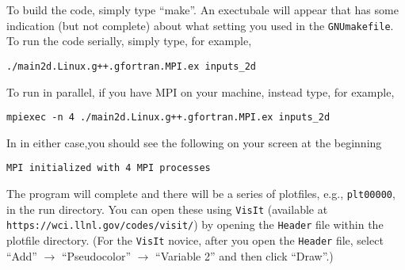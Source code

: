 To build the code, simply type ``make''.  An exectubale will appear that has some indication (but not complete)
about what setting you used in the {\tt GNUmakefile}.  To run the code serially, simply type, for example,
\begin{lstlisting}[language={[gnu]make},mathescape=false]
./main2d.Linux.g++.gfortran.MPI.ex inputs_2d
\end{lstlisting}
To run in parallel, if you have MPI on your machine, instead type, for example,
\begin{lstlisting}[language={[gnu]make},mathescape=false]
mpiexec -n 4 ./main2d.Linux.g++.gfortran.MPI.ex inputs_2d
\end{lstlisting}
In in either case,you should see the following on your screen at the beginning
\begin{lstlisting}[language={[gnu]make},mathescape=false]
MPI initialized with 4 MPI processes
\end{lstlisting}
The program will complete and there will be a series of plotfiles, e.g., {\tt plt00000}, in the run directory.
You can open these using {\tt VisIt} (available at {\tt https://wci.llnl.gov/codes/visit/}) by opening
the {\tt Header} file within the plotfile directory.  (For the {\tt VisIt} novice, after you open the {\tt Header}
file, select ``Add'' $\rightarrow$ ``Pseudocolor'' $\rightarrow$ ``Variable 2'' and then click ``Draw''.)
